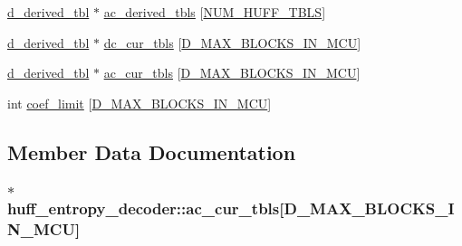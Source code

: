\begin{DoxyCompactItemize}
\hyperlink{structd__derived__tbl}{d\+\_\+derived\+\_\+tbl} $\ast$ \hyperlink{structhuff__entropy__decoder_a19edd8c7e80bfe34c21e6fe35ef90cce}{ac\+\_\+derived\+\_\+tbls} \mbox{[}\hyperlink{jpeglib_8h_a6b12985705944e0623b671f29dc5722e}{N\+U\+M\+\_\+\+H\+U\+F\+F\+\_\+\+T\+B\+L\+S}\mbox{]}
\item 
\hyperlink{structd__derived__tbl}{d\+\_\+derived\+\_\+tbl} $\ast$ \hyperlink{structhuff__entropy__decoder_a63725587525df86501d2a632152c01c0}{dc\+\_\+cur\+\_\+tbls} \mbox{[}\hyperlink{jpeglib_8h_af974a668decc270fb4d00587618dd110}{D\+\_\+\+M\+A\+X\+\_\+\+B\+L\+O\+C\+K\+S\+\_\+\+I\+N\+\_\+\+M\+C\+U}\mbox{]}
\item 
\hyperlink{structd__derived__tbl}{d\+\_\+derived\+\_\+tbl} $\ast$ \hyperlink{structhuff__entropy__decoder_af9d82cc6c9c90aa6bc3d5fc324967d7c}{ac\+\_\+cur\+\_\+tbls} \mbox{[}\hyperlink{jpeglib_8h_af974a668decc270fb4d00587618dd110}{D\+\_\+\+M\+A\+X\+\_\+\+B\+L\+O\+C\+K\+S\+\_\+\+I\+N\+\_\+\+M\+C\+U}\mbox{]}
\item 
int \hyperlink{structhuff__entropy__decoder_a28830ac6bc49fafca8325b1ec0472a33}{coef\+\_\+limit} \mbox{[}\hyperlink{jpeglib_8h_af974a668decc270fb4d00587618dd110}{D\+\_\+\+M\+A\+X\+\_\+\+B\+L\+O\+C\+K\+S\+\_\+\+I\+N\+\_\+\+M\+C\+U}\mbox{]}
\end{DoxyCompactItemize}


\subsection{Member Data Documentation}
\hypertarget{structhuff__entropy__decoder_af9d82cc6c9c90aa6bc3d5fc324967d7c}{}
\subsubsection[{ac\+\_\+cur\+\_\+tbls}]{$\ast$ huff\+\_\+entropy\+\_\+decoder\+::ac\+\_\+cur\+\_\+tbls\mbox{[}{\bf D\+\_\+\+M\+A\+X\+\_\+\+B\+L\+O\+C\+K\+S\+\_\+\+I\+N\+\_\+\+M\+C\+U}\mbox{]}}\label{structhuff__entropy__decoder_af9d82cc6c9c90aa6bc3d5fc324967d7c}
\hypertarget{structhuff__entropy__decoder_adbbf18c6aa3065d9bcf6bf33079733e0}{}
